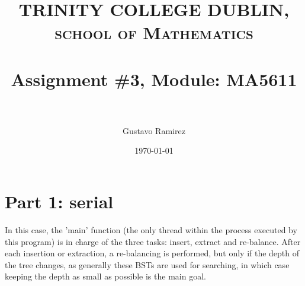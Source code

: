 \documentclass[paper=a4, fontsize=11pt]{scrartcl} %
\title{	
\normalfont \normalsize 
\textsc{TRINITY COLLEGE DUBLIN, school of Mathematics} \\ [25pt] %
\horrule{0.5pt} \\[0.4cm] %
\huge Assignment \#3, Module: MA5611 \\ %
\horrule{2pt} \\[0.5cm] %
}
\author{Gustavo Ramirez} %
\date{\normalsize\today} %
\numberwithin{equation}{section} %
\numberwithin{figure}{section} %
\numberwithin{table}{section} %
\begin{document}
\maketitle %


\begin{comment}
\section{Problem description}

\begin{enumerate}
\item 
\item 
\item 
\item 
\end{enumerate}

\end{comment}

\newpage


\begin{comment}

USEFUL LINKS:

official sources for terminology:
-----
http://www.intel.com/content/www/us/en/support/topics/glossary.html
https://www-01.ibm.com/software/globalization/terminology/a.html
-----




about IMB processors:
-----

insert in google: list of ibm processors
https://en.wikipedia.org/wiki/List_of_IBM_products
https://www-01.ibm.com/software/passportadvantage/guide_to_identifying_processor_family.html
http://www.nextplatform.com/2015/08/10/ibm-roadmap-extends-power-chips-to-2020-and-beyond/
http://www.theverge.com/2015/7/9/8919091/ibm-7nm-transistor-processor
https://www.ibm.com/developerworks/ibmi/library/i-ibmi-7_2-and-ibm-power8/
-----




\end{comment}


\section{Part 1: serial}

In this case, the 'main' function (the only thread within the process executed by this program) is in charge of the three tasks: insert, extract and re-balance. After each insertion or extraction, a re-balancing is performed, but only if the depth of the tree changes, as generally these BSTs are used for searching, in which case keeping the depth as small as possible is the main goal.
\end{document}
